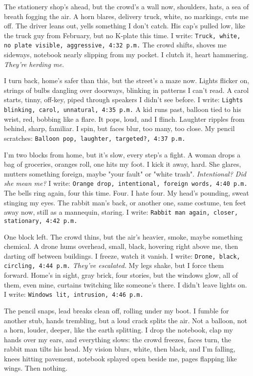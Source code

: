 \documentclass[12pt,oneside]{book} %
\newcommand{\note}[1]{\texttt{#1}}
\begin{document}
The stationery shop’s ahead, but the crowd’s a wall now, shoulders, hats, a sea of breath fogging the air. A horn blares, delivery truck, white, no markings, cuts me off. The driver leans out, yells something I don’t catch. His cap’s pulled low, like the truck guy from February, but no K-plate this time. I write: \note{Truck, white, no plate visible, aggressive, 4:32 p.m.} The crowd shifts, shoves me sideways, notebook nearly slipping from my pocket. I clutch it, heart hammering. \textit{They’re herding me.} 

I turn back, home’s safer than this, but the street’s a maze now. Lights flicker on, strings of bulbs dangling over doorways, blinking in patterns I can’t read. A carol starts, tinny, off-key, piped through speakers I didn’t see before. I write: \note{Lights blinking, carol, unnatural, 4:35 p.m.} A kid runs past, balloon tied to his wrist, red, bobbing like a flare. It pops, loud, and I flinch. Laughter ripples from behind, sharp, familiar. I spin, but faces blur, too many, too close. My pencil scratches: \note{Balloon pop, laughter, targeted?, 4:37 p.m.}

I’m two blocks from home, but it’s slow, every step’s a fight. A woman drops a bag of groceries, oranges roll, one hits my foot. I kick it away, hard. She glares, mutters something foreign, maybe "your fault" or "white trash". \textit{Intentional? Did she mean me?} I write: \note{Orange drop, intentional, foreign words, 4:40 p.m.} The bells ring again, four this time. Four. I hate four. My head’s pounding, sweat stinging my eyes. The rabbit man’s back, or another one, same costume, ten feet away now, still as a mannequin, staring. I write: \note{Rabbit man again, closer, stationary, 4:42 p.m.}

One block left. The crowd thins, but the air’s heavier, smoke, maybe something chemical. A drone hums overhead, small, black, hovering right above me, then darting off between buildings. I freeze, watch it vanish. I write: \note{Drone, black, circling, 4:44 p.m.} \textit{They’ve escalated.} My legs shake, but I force them forward. Home’s in sight, gray brick, four stories, but the windows glow, all of them, even mine, curtains twitching like someone’s there. I didn’t leave lights on. I write: \note{Windows lit, intrusion, 4:46 p.m.}

The pencil snaps, lead breaks clean off, rolling under my boot. I fumble for another stub, hands trembling, but a loud crack splits the air. Not a balloon, not a horn, louder, deeper, like the earth splitting. I drop the notebook, clap my hands over my ears, and everything slows: the crowd freezes, faces turn, the rabbit man tilts his head. My vision blurs, white, then black, and I’m falling, knees hitting pavement, notebook splayed open beside me, pages flapping like wings. Then nothing.
\end{document}
